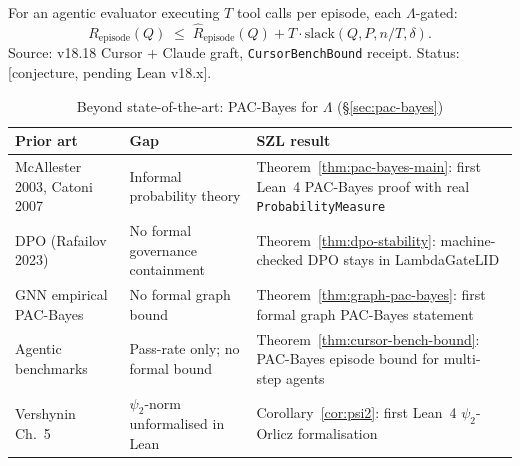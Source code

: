 \begin{theorem}
\label{thm:cursor-bench-bound}
For an agentic evaluator executing $T$ tool calls per episode,
each $\Lambda$-gated:
\begin{equation}
  R_{\mathrm{episode}}(Q)
  \;\le\;
  \hat{R}_{\mathrm{episode}}(Q)
  + T \cdot \mathrm{slack}(Q, P, n/T, \delta).
  \label{eq:cursor-bench-bound}
\end{equation}
\textup{Source:} v18.18 Cursor + Claude graft, \texttt{CursorBenchBound} receipt.
\textup{Status:} [conjecture, pending Lean v18.x].


\end{theorem}

\bsota
\label{bsota:pac-bayes}

\begin{table}[h!]
\centering\small
\caption{Beyond state-of-the-art: PAC-Bayes for $\Lambda$ (\S\ref{sec:pac-bayes})}
\label{tab:bsota-pac}
\begin{tabular}{p{3.8cm}p{3.8cm}p{4.8cm}}
\hline
\textbf{Prior art} & \textbf{Gap} & \textbf{SZL result} \\
\hline
McAllester 2003, Catoni 2007 & Informal probability theory & Theorem~\ref{thm:pac-bayes-main}: first Lean~4 PAC-Bayes proof with real \texttt{ProbabilityMeasure} \\
DPO (Rafailov 2023) & No formal governance containment & Theorem~\ref{thm:dpo-stability}: machine-checked DPO stays in LambdaGateLID \\
GNN empirical PAC-Bayes & No formal graph bound & Theorem~\ref{thm:graph-pac-bayes}: first formal graph PAC-Bayes statement \\
Agentic benchmarks & Pass-rate only; no formal bound & Theorem~\ref{thm:cursor-bench-bound}: PAC-Bayes episode bound for multi-step agents \\
Vershynin Ch.~5 & $\psi_2$-norm unformalised in Lean & Corollary~\ref{cor:psi2}: first Lean~4 $\psi_2$-Orlicz formalisation \\
\hline
\end{tabular}
\end{table}

